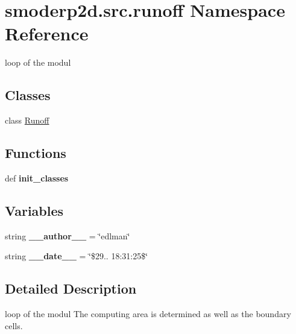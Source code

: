 \hypertarget{namespacesmoderp2d_1_1src_1_1runoff}{\section{smoderp2d.\-src.\-runoff Namespace Reference}
\label{namespacesmoderp2d_1_1src_1_1runoff}
}


loop of the modul  


\subsection*{Classes}
\begin{DoxyCompactItemize}
\item 
class \hyperlink{classsmoderp2d_1_1src_1_1runoff_1_1Runoff}{Runoff}
\end{DoxyCompactItemize}
\subsection*{Functions}
\begin{DoxyCompactItemize}
\item 
\hypertarget{namespacesmoderp2d_1_1src_1_1runoff_a036fc50c0cd8023789f583faa10b7efd}{def {\bfseries init\-\_\-classes}}\label{namespacesmoderp2d_1_1src_1_1runoff_a036fc50c0cd8023789f583faa10b7efd}

\end{DoxyCompactItemize}
\subsection*{Variables}
\begin{DoxyCompactItemize}
\item 
\hypertarget{namespacesmoderp2d_1_1src_1_1runoff_a82ea7ee00bf9c766aa1e366a184b4a57}{string {\bfseries \-\_\-\-\_\-author\-\_\-\-\_\-} = \char`\"{}edlman\char`\"{}}\label{namespacesmoderp2d_1_1src_1_1runoff_a82ea7ee00bf9c766aa1e366a184b4a57}

\item 
\hypertarget{namespacesmoderp2d_1_1src_1_1runoff_ad0163d8013d0f0f3cd12f9fcda57854d}{string {\bfseries \-\_\-\-\_\-date\-\_\-\-\_\-} = \char`\"{}\$29.. 18\-:31\-:25\$\char`\"{}}\label{namespacesmoderp2d_1_1src_1_1runoff_ad0163d8013d0f0f3cd12f9fcda57854d}

\end{DoxyCompactItemize}


\subsection{Detailed Description}
loop of the modul The computing area is determined as well as the boundary cells.

